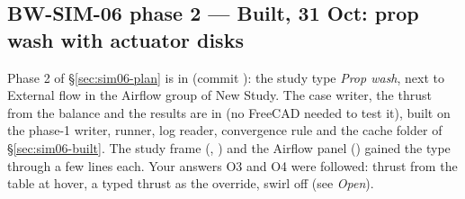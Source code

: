 \subsection{BW-SIM-06 phase 2 --- Built, 31 Oct: prop wash with actuator disks}\label{sec:sim06-wash-built}

Phase 2 of \S\ref{sec:sim06-plan} is in (commit ): the study type
\emph{Prop wash}, next to External flow in the Airflow group of New Study. The case writer, the thrust from the
balance and the results are in  (no FreeCAD needed to test it),
built on the phase-1 writer, runner, log reader, convergence rule and the cache folder of \S\ref{sec:sim06-built}.
The study frame (, ) and the Airflow panel
() gained the type through a few lines each. Your answers O3 and O4 were followed:
thrust from the  table at hover, a typed thrust as the override, swirl off (see \emph{Open}).

